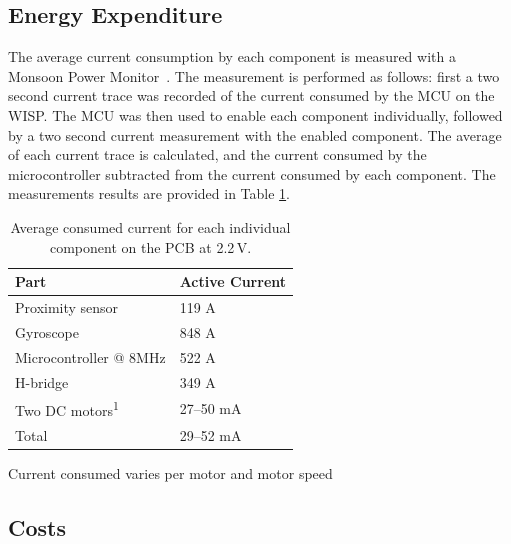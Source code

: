 \subsection{Energy Expenditure}

The average current consumption by each component is measured with a Monsoon Power Monitor~\cite{monsoon_powermonitor_2017}.
The measurement is performed as follows: first a two second current trace was recorded of the current consumed by the MCU on the WISP.
The MCU was then used to enable each component individually, followed by a two second current measurement with the enabled component.
The average of each current trace is calculated, and the current consumed by the microcontroller subtracted from the current consumed by each component.
The measurements results are provided in Table \ref{tab:avg_cur_comp}.


\begin{table}[t]
	\centering
	\begin{threeparttable}
		\caption{Average consumed current for each individual component on the PCB at 2.2\,V.}
		\label{tab:avg_cur_comp}
		\begin{tabular}{|l|l|} 
			\hline
			Part & Active Current \\
			\hline\hline
			Proximity sensor & 119 \textmu A \\
			Gyroscope & 848 \textmu A\\	
			Microcontroller @ 8MHz & 522 \textmu A\\
			H-bridge & 349 \textmu A \\
			Two DC motors\textsuperscript{1} & 27--50 mA  \\
			\hline \hline
			Total & 29--52 mA \\
			\hline
		\end{tabular}
		\begin{tablenotes}
		\small
		\item [1] Current consumed varies per motor and motor speed
		\end{tablenotes}
	\end{threeparttable}
\end{table}

\subsection{Costs}

